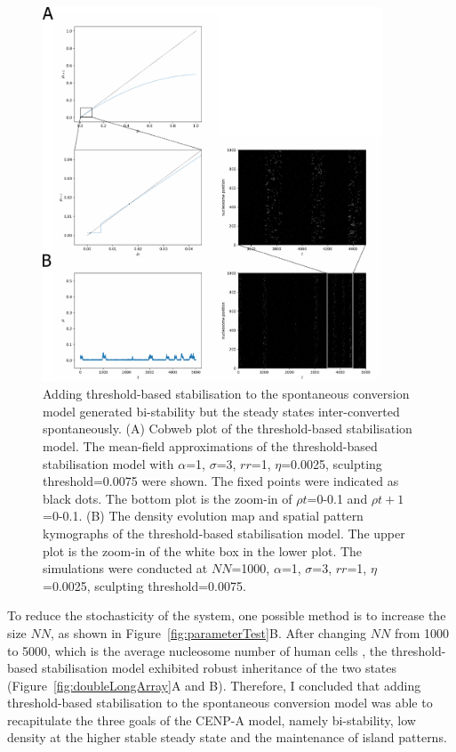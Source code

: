 \begin{figure}[htbp]
  \centering
  \includegraphics[width=0.9\textwidth]{chapter2/figures/doubleCobweb.pdf}
  \caption[Adding threshold-based stabilisation to the spontaneous conversion model generated bi-stability but the steady states inter-converted spontaneously]{Adding threshold-based stabilisation to the spontaneous conversion model generated bi-stability but the steady states inter-converted spontaneously. (A) Cobweb plot of the threshold-based stabilisation model. The mean-field approximations of the threshold-based stabilisation model with $\alpha$=1, $\sigma$=3, $rr$=1, $\eta$=0.0025, sculpting threshold=0.0075 were shown. The fixed points were indicated as black dots. The bottom plot is the zoom-in of $\rho{t}$=0-0.1 and $\rho{t+1}$=0-0.1. (B) The density evolution map and spatial pattern kymographs of the threshold-based stabilisation model. The upper plot is the zoom-in of the white box in the lower plot. The simulations were conducted at $NN$=1000, $\alpha$=1, $\sigma$=3, $rr$=1, $\eta$=0.0025, sculpting threshold=0.0075. }
  \label{fig:doubleCobweb}
\end{figure}

To reduce the stochasticity of the system, one possible method is to increase the size $NN$, as shown in Figure~\ref{fig:parameterTest}B. After changing $NN$ from 1000 to 5000, which is the average nucleosome number of human cells \citep{Bodor2014}, the threshold-based stabilisation model exhibited robust inheritance of the two states (Figure~\ref{fig:doubleLongArray}A and B). Therefore, I concluded that adding threshold-based stabilisation to the spontaneous conversion model was able to recapitulate the three goals of the CENP-A model, namely bi-stability, low density at the higher stable steady state and the maintenance of island patterns.


